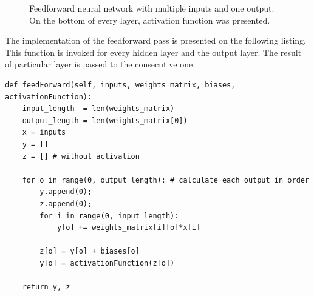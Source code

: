 \begin{figure}[H]
	\begin{center}
	\end{center}
	\caption{Feedforward neural network with multiple inputs and one output. On the bottom of every layer, activation function was presented.}

	\label{fig:feedforward}
\end{figure}
The implementation of the feedforward pass is presented on the following listing. This function is invoked for every hidden layer and the output layer. The result of particular layer is passed to the consecutive one.
\begin{verbatim}
def feedForward(self, inputs, weights_matrix, biases, activationFunction):
    input_length  = len(weights_matrix)
    output_length = len(weights_matrix[0])
    x = inputs
    y = []
    z = [] # without activation
    
    for o in range(0, output_length): # calculate each output in order
        y.append(0);
        z.append(0);
        for i in range(0, input_length):
            y[o] += weights_matrix[i][o]*x[i]
    
        z[o] = y[o] + biases[o]
        y[o] = activationFunction(z[o])
        
    return y, z
\end{verbatim}

